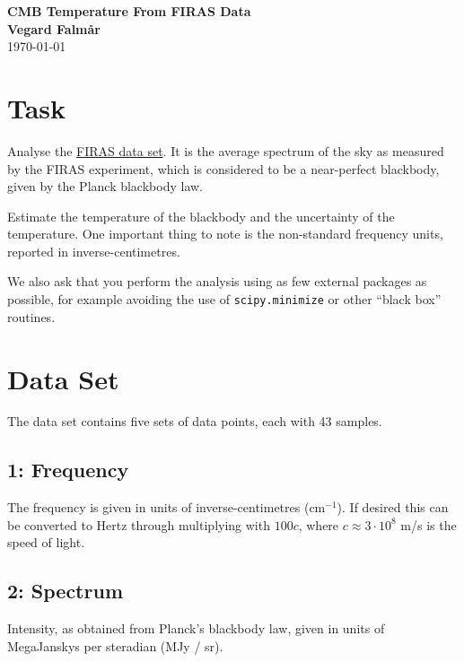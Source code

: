 \documentclass[a4paper,onecolumn,12pt]{revtex4-1}
\begin{document}
\begin{center}
{\bf \Large CMB Temperature From FIRAS Data\\}
{\bf Vegard Falmår\\}
\today
\end{center}





\section{Task}

Analyse the
\href{https://lambda.gsfc.nasa.gov/data/cobe/firas/monopole_spec/firas_monopole_spec_v1.txt}{FIRAS data set}.
It is the average spectrum of the sky as measured by the FIRAS experiment, which is considered to be a near-perfect blackbody, given by the Planck blackbody law.

Estimate the temperature of the blackbody and the uncertainty of the temperature. One important thing to note is the non-standard frequency units, reported in inverse-centimetres.

We also ask that you perform the analysis using as few external packages as possible, for example avoiding the use of \texttt{scipy.minimize} or other
``black box'' routines.





\section{Data Set}

The data set contains five sets of data points, each with 43 samples.

\subsection*{1: Frequency}

The frequency is given in units of inverse-centimetres (cm\(^{-1}\)). If desired this can be converted to Hertz through multiplying with \(100 c\), where \(c \approx 3 \cdot 10^8\) m/s is the speed of light.



\subsection*{2: Spectrum}

Intensity, as obtained from Planck's blackbody law, given in units of MegaJanskys per steradian (MJy / sr).
\end{document}
